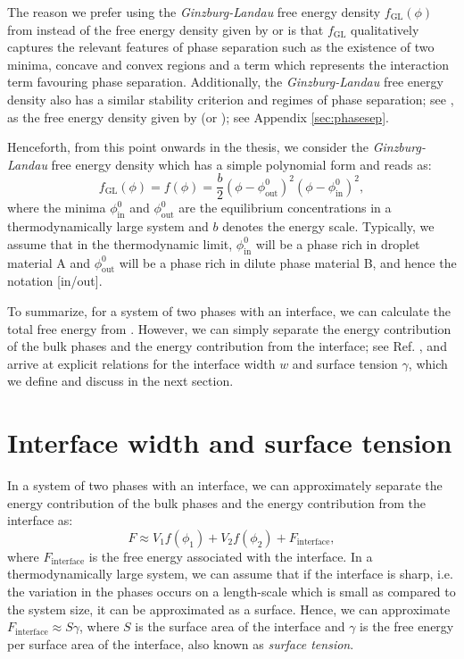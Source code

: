 The reason we prefer using the \textit{Ginzburg-Landau} free energy density $f_{\mathrm{GL}}(\phi)$ from  instead of the free energy density given by  or  is that $f_{\mathrm{GL}}$ qualitatively captures the relevant features of phase separation such as the existence of two minima, concave and convex regions and a term which represents the interaction term favouring phase separation.
Additionally, the \textit{Ginzburg-Landau} free energy density also has a similar stability criterion and regimes of phase separation; see , as the free energy density given by  (or ); see Appendix \ref{sec:phasesep}.

Henceforth, from this point onwards in the thesis, we consider the \textit{Ginzburg-Landau} free energy density which has a simple polynomial form and reads as:
\begin{equation}\label{eqn:free_energy}
    f_{\mathrm{GL}}(\phi) = f(\phi) = \frac{b}{2}(\phi - \phi^{0}_\mathrm{out})^2(\phi - \phi^{0}_\mathrm{in})^2,
\end{equation}
where the minima $\phi^{0}_\mathrm{in}$ and $\phi^{0}_\mathrm{out}$ are the equilibrium concentrations in a thermodynamically large system and $b$ denotes the energy scale.
Typically, we assume that in the thermodynamic limit, $\phi^{0}_\mathrm{in}$ will be a phase rich in droplet material A and $\phi^{0}_\mathrm{out}$ will be a phase rich in dilute phase material B, and hence the notation [in/out].

To summarize, for a system of two phases with an interface, we can calculate the total free energy from .
However, we can simply separate the energy contribution of the bulk phases and the energy contribution from the interface; see Ref. \cite{Review2019}, and arrive at explicit relations for the interface width $w$ and surface tension $\gamma$, which we define and discuss in the next section. 

\section{Interface width and surface tension}

In a system of two phases with an interface, we can approximately separate the energy contribution of the bulk phases and the energy contribution from the interface as:
\begin{equation*}
    F \approx V_1 f(\phi_1) + V_2 f(\phi_2) + F_\mathrm{interface},
\end{equation*}
where $F_\mathrm{interface}$ is the free energy associated with the interface.
In a thermodynamically large system, we can assume that if the interface is sharp, i.e. the variation in the phases occurs on a length-scale which is small as compared to the system size, it can be approximated as a surface.
Hence, we can approximate $F_\mathrm{interface} \approx S \gamma$, where $S$ is the surface area of the interface and $\gamma$ is the free energy per surface area of the interface, also known as \textit{surface tension}.

